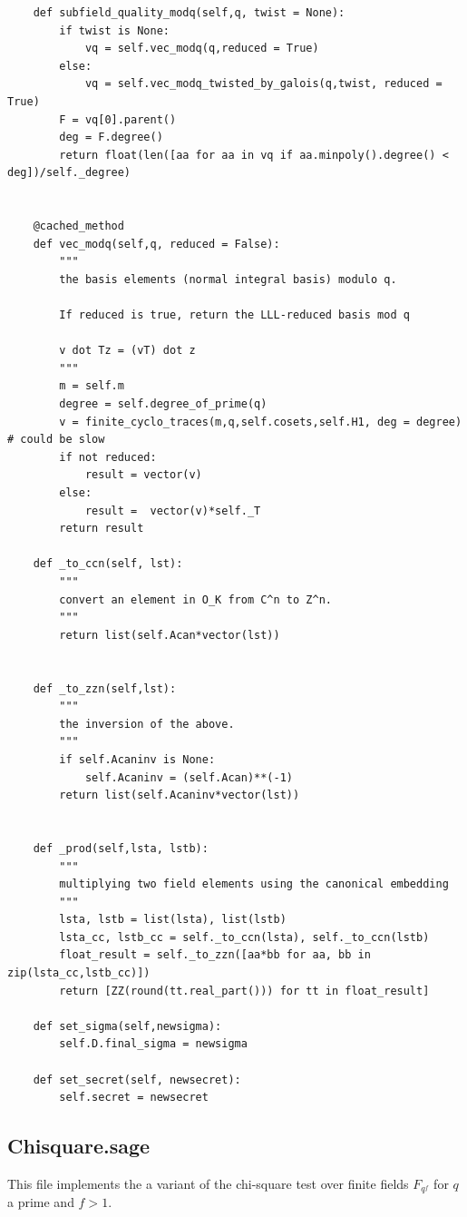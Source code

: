 \documentclass[envcountsame]{llncs}
\begin{document}
\begin{verbatim}
    def subfield_quality_modq(self,q, twist = None):
        if twist is None:
            vq = self.vec_modq(q,reduced = True)
        else:
            vq = self.vec_modq_twisted_by_galois(q,twist, reduced = True)
        F = vq[0].parent()
        deg = F.degree()
        return float(len([aa for aa in vq if aa.minpoly().degree() < deg])/self._degree)


    @cached_method
    def vec_modq(self,q, reduced = False):
        """
        the basis elements (normal integral basis) modulo q.

        If reduced is true, return the LLL-reduced basis mod q

        v dot Tz = (vT) dot z
        """
        m = self.m
        degree = self.degree_of_prime(q)
        v = finite_cyclo_traces(m,q,self.cosets,self.H1, deg = degree) # could be slow
        if not reduced:
            result = vector(v)
        else:
            result =  vector(v)*self._T
        return result

    def _to_ccn(self, lst):
        """
        convert an element in O_K from C^n to Z^n.
        """
        return list(self.Acan*vector(lst))


    def _to_zzn(self,lst):
        """
        the inversion of the above.
        """
        if self.Acaninv is None:
            self.Acaninv = (self.Acan)**(-1)
        return list(self.Acaninv*vector(lst))


    def _prod(self,lsta, lstb):
        """
        multiplying two field elements using the canonical embedding
        """
        lsta, lstb = list(lsta), list(lstb)
        lsta_cc, lstb_cc = self._to_ccn(lsta), self._to_ccn(lstb)
        float_result = self._to_zzn([aa*bb for aa, bb in zip(lsta_cc,lstb_cc)])
        return [ZZ(round(tt.real_part())) for tt in float_result]

    def set_sigma(self,newsigma):
        self.D.final_sigma = newsigma

    def set_secret(self, newsecret):
        self.secret = newsecret
\end{verbatim}

\subsection{Chisquare.sage}

\normalsize
This file implements the a variant of the chi-square test over finite fields $F_{q^f}$ for $q$ a prime and $f > 1$.
\end{document}
